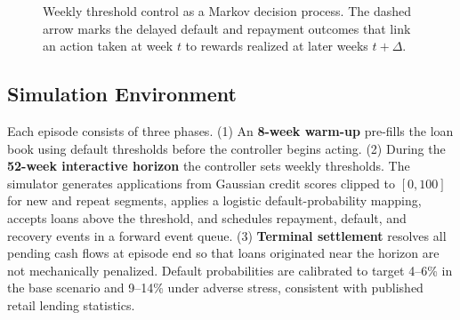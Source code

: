 \documentclass[preprint,review,authoryear,12pt]{elsarticle}
\begin{document}
\begin{figure}[t]
    \centering
    \caption{Weekly threshold control as a Markov decision process. The dashed arrow marks
        the delayed default and repayment outcomes that link an action taken at week $t$ to
        rewards realized at later weeks $t+\Delta$.}
    \label{fig:mdp-loop}
\end{figure}

\subsection{Simulation Environment}

Each episode consists of three phases. (1) An \textbf{8-week warm-up} pre-fills the loan
book using default thresholds before the controller begins acting. (2) During the
\textbf{52-week interactive horizon} the controller sets weekly thresholds. The simulator
generates applications from Gaussian credit scores clipped to $[0,100]$ for new and repeat segments,
applies a logistic default-probability mapping, accepts loans above the threshold, and
schedules repayment, default, and recovery events in a forward event queue.
(3) \textbf{Terminal settlement} resolves all pending cash flows at episode end so that
loans originated near the horizon are not mechanically penalized. Default probabilities
are calibrated to target 4--6\% in the base scenario and 9--14\% under adverse stress,
consistent with published retail lending statistics.
\end{document}
